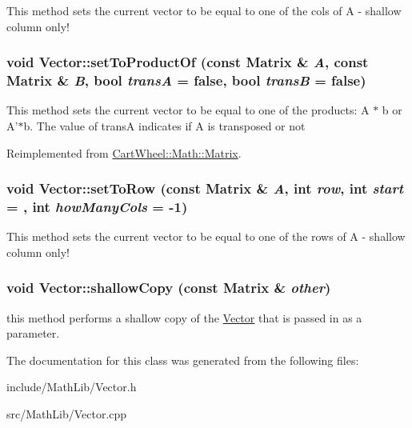 \label{classCartWheel_1_1Math_1_1Vector_ae98317a1a169070e52436ed4b6c62c5c}
This method sets the current vector to be equal to one of the cols of A -\/ shallow column only! \hypertarget{classCartWheel_1_1Math_1_1Vector_a3c20feee35a90b2b4da394d7851a0437}{
\subsubsection[{setToProductOf}]{\setlength{\rightskip}{0pt plus 5cm}void Vector::setToProductOf (const {\bf Matrix} \& {\em A}, \/  const {\bf Matrix} \& {\em B}, \/  bool {\em transA} = {\ttfamily false}, \/  bool {\em transB} = {\ttfamily false})}}
\label{classCartWheel_1_1Math_1_1Vector_a3c20feee35a90b2b4da394d7851a0437}
This method sets the current vector to be equal to one of the products: A $\ast$ b or A'$\ast$b. The value of transA indicates if A is transposed or not 

Reimplemented from \hyperlink{classCartWheel_1_1Math_1_1Matrix_ac2f4452cecbb5ffdaf6df379229fa22e}{CartWheel::Math::Matrix}.

\hypertarget{classCartWheel_1_1Math_1_1Vector_acbfd79aa84ad65acabe6ef03f0329e7c}{
\subsubsection[{setToRow}]{\setlength{\rightskip}{0pt plus 5cm}void Vector::setToRow (const {\bf Matrix} \& {\em A}, \/  int {\em row}, \/  int {\em start} = {}, \/  int {\em howManyCols} = {\ttfamily -\/1})}}
\label{classCartWheel_1_1Math_1_1Vector_acbfd79aa84ad65acabe6ef03f0329e7c}
This method sets the current vector to be equal to one of the rows of A -\/ shallow column only! \hypertarget{classCartWheel_1_1Math_1_1Vector_a8a80f871c2514f51041a4c960659c53a}{
\subsubsection[{shallowCopy}]{\setlength{\rightskip}{0pt plus 5cm}void Vector::shallowCopy (const {\bf Matrix} \& {\em other})}}
\label{classCartWheel_1_1Math_1_1Vector_a8a80f871c2514f51041a4c960659c53a}
this method performs a shallow copy of the \hyperlink{classCartWheel_1_1Math_1_1Vector}{Vector} that is passed in as a parameter. 

The documentation for this class was generated from the following files:\begin{DoxyCompactItemize}
\item 
include/MathLib/Vector.h\item 
src/MathLib/Vector.cpp\end{DoxyCompactItemize}
